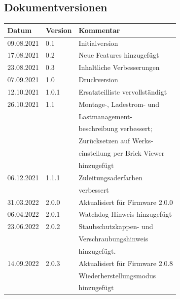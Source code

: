 \documentclass[a4paper,10pt]{article}
\begin{document}
\begin{multicols*}{2}
    \section{Dokumentversionen}
    \begin{tabular}{lll}
        \toprule
        Datum      & Version & Kommentar                       \\
        \midrule
        09.08.2021 & 0.1     & Initialversion                  \\
        17.08.2021 & 0.2     & Neue Features hinzugefügt       \\
        23.08.2021 & 0.3     & Inhaltliche Verbesserungen      \\
        07.09.2021 & 1.0     & Druckversion                    \\
        12.10.2021 & 1.0.1   & Ersatzteilliste vervollständigt \\
        26.10.2021 & 1.1     & Montage-, Ladestrom- und        \\
                   &         & Lastmanagement-                 \\
                   &         & beschreibung verbessert;        \\
                   &         & Zurücksetzen auf Werks-         \\
                   &         & einstellung per Brick Viewer    \\
                   &         & hinzugefügt                     \\
        06.12.2021 & 1.1.1   & Zuleitungsaderfarben            \\
                   &         & verbessert                      \\
        31.03.2022 & 2.0.0   & Aktualisiert für Firmware 2.0.0 \\
        06.04.2022 & 2.0.1   & Watchdog-Hinweis hinzugefügt    \\
        23.06.2022 & 2.0.2   & Staubschutzkappen- und          \\
                   &         & Verschraubungshinweis           \\
                   &         & hinzugefügt.                    \\
        14.09.2022 & 2.0.3   & Aktualisiert für Firmware 2.0.8 \\
                   &         & Wiederherstellungsmodus         \\
                   &         & hinzugefügt                     \\

\end{tabular}
\end{multicols*}
\end{document}
